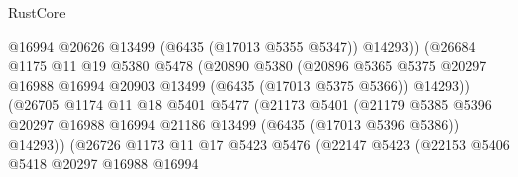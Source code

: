 \begin{lexlean}{RustCore}
\begin{coremodule}
                                      @16994
                                      @20626
                                      @13499
                                      (@6435 (@17013 @5355 @5347))
                                      @14293))
                                  (@26684
                                    @1175
                                    @11
                                    @19
                                    @5380
                                    @5478
                                    (@20890
                                      @5380
                                      (@20896
                                        @5365
                                        @5375
                                        @20297
                                        @16988
                                        @16994
                                        @20903
                                        @13499
                                        (@6435 (@17013 @5375 @5366))
                                        @14293))
                                    (@26705
                                      @1174
                                      @11
                                      @18
                                      @5401
                                      @5477
                                      (@21173
                                        @5401
                                        (@21179
                                          @5385
                                          @5396
                                          @20297
                                          @16988
                                          @16994
                                          @21186
                                          @13499
                                          (@6435 (@17013 @5396 @5386))
                                          @14293))
                                      (@26726
                                        @1173
                                        @11
                                        @17
                                        @5423
                                        @5476
                                        (@22147
                                          @5423
                                          (@22153
                                            @5406
                                            @5418
                                            @20297
                                            @16988
                                            @16994

\end{coremodule}
\end{lexlean}
